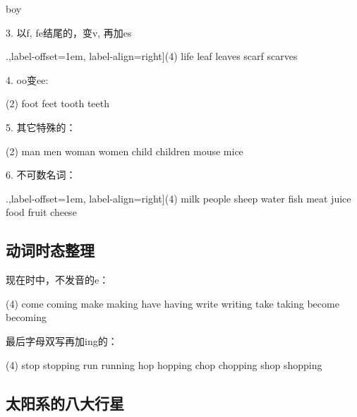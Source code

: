 \documentclass[a4paper]{article}
\begin{document}
 \qquad boy

3. 以f, fe结尾的，变v, 再加es
\begin{tasks}[counter-format=tsk[1].,label-offset=1em, label-align=right](4)
 \task life  \task leaf  \task leaves
 \task scarf  \task scarves
\end{tasks}

4. oo变ee:

\begin{tasks}[style=itemize](2)
 \task foot   \task feet
 \task tooth  \task teeth
\end{tasks}

5. 其它特殊的：

\begin{tasks}[style=itemize](2)
 \task man  \task men       \task woman  \task women
 \task child  \task children \task mouse \task mice
\end{tasks}

6. 不可数名词：

\begin{tasks}[counter-format=tsk[1].,label-offset=1em, label-align=right](4)
  \task milk \task people \task sheep  \task water
  \task fish \task meat   \task juice  \task food
  \task fruit \task cheese
\end{tasks}

  \subsection{动词时态整理}\label{secEngProgress.VerbShitai}

现在时中，不发音的e：

\begin{tasks}[style=itemize](4)
 \task come  \task coming  \task make    \task making
 \task have  \task having  \task write   \task writing
 \task take  \task taking  \task become  \task becoming
\end{tasks}

最后字母双写再加ing的：

\begin{tasks}[style=itemize](4)
 \task stop  \task stopping   \task run   \task running
 \task hop   \task hopping    \task chop  \task chopping
 \task shop  \task shopping
\end{tasks}


  \subsection{太阳系的八大行星}
\end{document}
